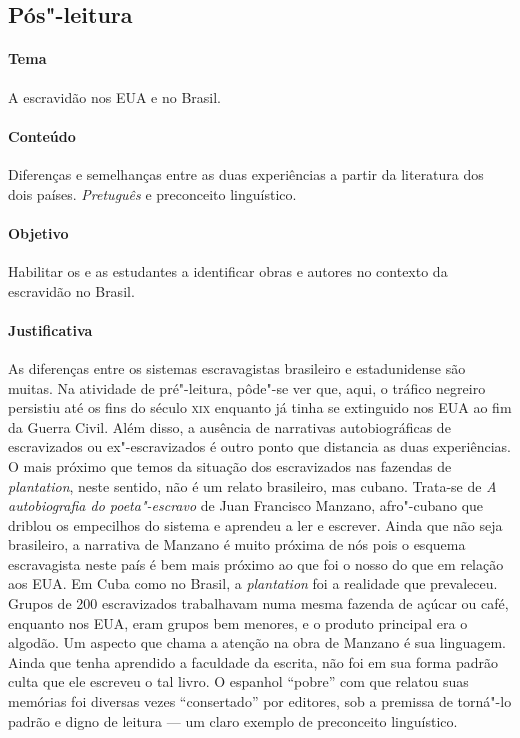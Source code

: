 \documentclass[11pt]{extarticle}
\begin{document}
\subsection{Pós"-leitura}

\paragraph{Tema} A escravidão nos EUA e no Brasil.

\paragraph{Conteúdo} Diferenças e semelhanças entre as duas experiências a partir da
literatura dos dois países. \textit{Pretuguês} e preconceito linguístico.

\paragraph{Objetivo} Habilitar os e as estudantes a identificar obras e autores no contexto
da escravidão no Brasil. 


\paragraph{Justificativa} As diferenças entre os sistemas escravagistas brasileiro e estadunidense são
muitas. Na atividade de pré"-leitura, pôde"-se ver que, aqui, o tráfico negreiro persistiu até
os fins do século \textsc{xix} enquanto já tinha se extinguido nos EUA ao fim da Guerra Civil. 
Além disso, a ausência de narrativas autobiográficas de escravizados ou ex"-escravizados é outro
ponto que distancia as duas experiências. O mais próximo que temos da situação dos escravizados 
nas fazendas de \textit{plantation}, neste sentido, não é um relato brasileiro, mas cubano. 
Trata-se de \textit{A autobiografia do poeta"-escravo} de Juan Francisco Manzano, afro"-cubano que driblou
os empecilhos do sistema e aprendeu a ler e escrever. Ainda que não seja brasileiro,
a narrativa de Manzano é muito próxima de nós pois o esquema escravagista neste país é bem
mais próximo ao que foi o nosso do que em relação aos EUA. Em Cuba como no Brasil, a 
\textit{plantation} foi a realidade que prevaleceu. Grupos de 200 escravizados trabalhavam numa
mesma fazenda de açúcar ou café, enquanto nos EUA, eram grupos bem menores, e o produto
principal era o algodão. 
Um aspecto que chama a atenção na obra de Manzano é sua linguagem. Ainda que tenha aprendido
a faculdade da escrita, não foi em sua forma padrão culta que ele escreveu o tal livro.
O espanhol ``pobre'' com que relatou suas memórias foi diversas vezes ``consertado'' por
editores, sob a premissa de torná"-lo padrão e digno de leitura --- um claro exemplo
de preconceito linguístico.
\end{document}
